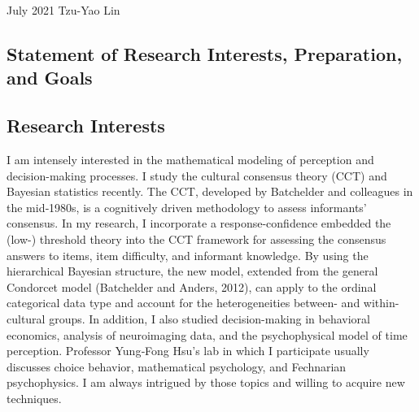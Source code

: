 \documentclass[11pt, a4paper]{awesome-cv}
\begin{document}
\makecvheader

\makecvfooter
  {July 2021}
    {Tzu-Yao Lin}
  {\thepage}





\begin{spacing}{1.5} 

\hypertarget{statement-of-research-interests-preparation-and-goals}{%
\section{Statement of Research Interests, Preparation, and
Goals}\label{statement-of-research-interests-preparation-and-goals}}

\begingroup
\fontsize{14pt}{1em}\bodyfontlight\bfseries\color{text}
\hypertarget{research-interests}{%
\subsection{Research Interests}\label{research-interests}}
\endgroup

\begingroup
\fontsize{12pt}{1em}\bodyfontlight\mdseries\color{text}
I am intensely interested in the mathematical modeling of perception and
decision-making processes. I study the cultural consensus theory (CCT)
and Bayesian statistics recently. The CCT, developed by Batchelder and
colleagues in the mid‑1980s, is a cognitively driven methodology to
assess informants' consensus. In my research, I incorporate a
response-confidence embedded the (low-) threshold theory into the CCT
framework for assessing the consensus answers to items, item difficulty,
and informant knowledge. By using the hierarchical Bayesian structure, the
new model, extended from the general Condorcet model (Batchelder and Anders, 2012), 
can apply to the ordinal categorical data type and account for the 
heterogeneities between- and within-cultural groups.
In addition, I also studied decision-making in
behavioral economics, analysis of neuroimaging data, and the
psychophysical model of time perception. Professor Yung‑Fong Hsu's lab
in which I participate usually discusses choice behavior, mathematical
psychology, and Fechnarian psychophysics. I am always intrigued by those topics and willing to acquire new techniques. 
\endgroup


\end{spacing}
\end{document}
